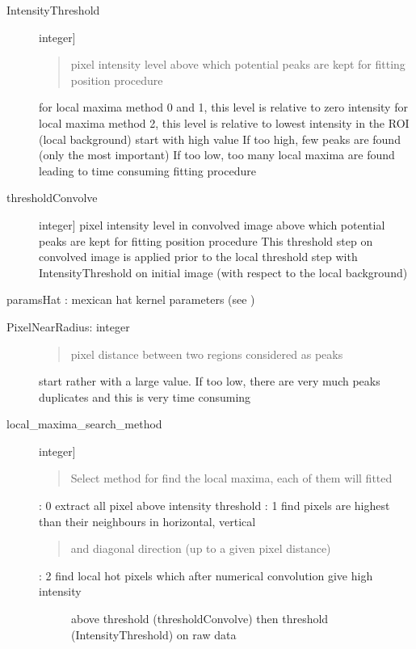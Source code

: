 \documentclass[letterpaper,10pt,english]{sphinxmanual}
\begin{document}
\begin{fulllineitems}
\begin{description}
\item[{IntensityThreshold}] \leavevmode{[}integer{]}\begin{quote}

pixel intensity level above which potential peaks are kept for fitting position procedure
\end{quote}

for local maxima method 0 and 1, this level is relative to zero intensity
for local maxima method 2, this level is relative to lowest intensity in the ROI (local background)
start with high value
If too high, few peaks are found (only the most important)
If too low, too many local maxima are found leading to time consuming fitting procedure

\item[{thresholdConvolve}] \leavevmode{[}integer{]}
pixel intensity level in convolved image above which potential peaks are kept for fitting position procedure
This threshold step on convolved image is applied prior to the local threshold step with IntensityThreshold on initial image (with respect to the local background)

\end{description}

paramsHat :  mexican hat kernel parameters (see )
\begin{description}
\item[{PixelNearRadius: integer}] \leavevmode\begin{quote}

pixel distance between two regions considered as peaks
\end{quote}

start rather with a large value.
If too low, there are very much peaks duplicates and
this is very time consuming

\item[{local\_maxima\_search\_method}] \leavevmode{[}integer{]}\begin{quote}

Select method for find the local maxima, each of them will fitted
\end{quote}

: 0   extract all pixel above intensity threshold
: 1   find pixels are highest than their neighbours in horizontal, vertical
\begin{quote}

and diagonal direction (up to a given pixel distance)
\end{quote}
\begin{description}
\item[{: 2   find local hot pixels which after numerical convolution give high intensity}] \leavevmode
above threshold (thresholdConvolve)
then threshold (IntensityThreshold) on raw data


\end{description}
\end{description}
\end{fulllineitems}
\end{document}
